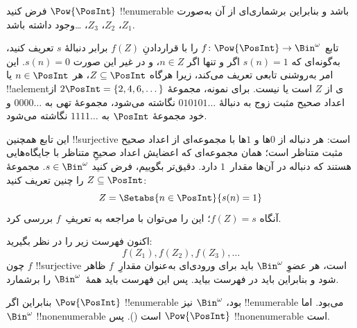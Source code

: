  {
  فرض کنید $\Pow{\PosInt}$ !!{enumerable} باشد و بنابراین برشماری‌ای از
  آن به‌صورت $Z_{1}$، $Z_{2}$، $Z_{3}$، \dots وجود داشته باشد.

  تابع $f \colon \Pow{\PosInt} \to \Bin^\omega$ را با قراردادنِ
  $f(Z)$ برابر دنبالهٔ $s$ تعریف کنید، به‌گونه‌ای که $s(n) = 1$ اگر و تنها
  اگر $n \in Z$، و در غیر این صورت $s(n) = 0$. این امر به‌روشنی تابعی
  تعریف می‌کند، زیرا هرگاه $Z \subseteq \PosInt$، هر $n \in \PosInt$ یا
  !!a{element}ی از $Z$ است یا نیست. برای نمونه، مجموعهٔ $2\PosInt = \{2,
  4, 6, \dots\}$ از اعداد صحیح مثبت زوج به دنبالهٔ $010101\dots$ نگاشته
  می‌شود، مجموعهٔ تهی به $0000\dots$ و خود مجموعهٔ $\PosInt$ به
  $1111\dots$ نگاشته می‌شود.

  این تابع همچنین !!{surjective} است: هر دنباله از $0$ها و $1$ها با
  مجموعه‌ای از اعداد صحیح مثبت متناظر است؛ همان مجموعه‌ای که اعضایش
  اعداد صحیحِ متناظر با جایگاه‌هایی هستند که دنباله در آن‌ها مقدار~$1$
  دارد. دقیق‌تر بگوییم، فرض کنید $s \in \Bin^\omega$. مجموعهٔ $Z
  \subseteq \PosInt$ را چنین تعریف کنید:
  \[
  Z = \Setabs{n \in \PosInt}{s(n) = 1}
  \]
  آنگاه $f(Z) = s$؛ این را می‌توان با مراجعه به تعریفِ~$f$ بررسی کرد.

  اکنون فهرست زیر را در نظر بگیرید:
  \[
  f(Z_1), f(Z_2), f(Z_3), \dots
  \]
  چون $f$ !!{surjective} است، هر عضوِ $\Bin^\omega$ باید برای ورودی‌ای
  به‌عنوان مقدارِ~$f$ ظاهر شود و بنابراین باید در فهرست بیاید. پس این
  فهرست باید همهٔ~$\Bin^\omega$ را برشمارد.

  بنابراین اگر $\Pow{\PosInt}$ !!{enumerable} بود، $\Bin^\omega$ نیز
  !!{enumerable} می‌بود. اما $\Bin^\omega$ !!{nonenumerable} است
  (). پس $\Pow{\PosInt}$
  !!{nonenumerable} است.
 }

